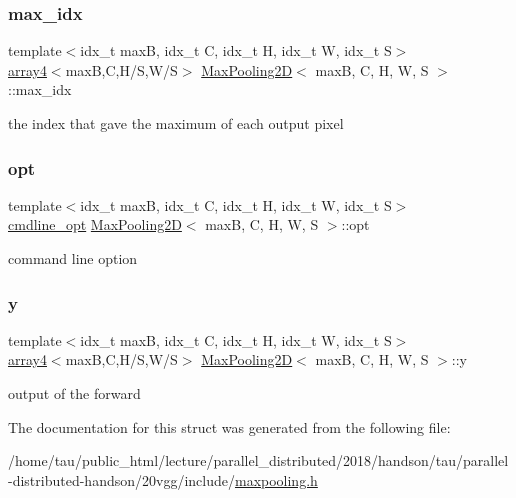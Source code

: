 \subsubsection{\texorpdfstring{max\+\_\+idx}{max\_idx}}
{\footnotesize\ttfamily template$<$idx\+\_\+t maxB, idx\+\_\+t C, idx\+\_\+t H, idx\+\_\+t W, idx\+\_\+t S$>$ \\
\hyperlink{structarray4}{array4}$<$maxB,C,H/S,W/S$>$ \hyperlink{structMaxPooling2D}{Max\+Pooling2D}$<$ maxB, C, H, W, S $>$\+::max\+\_\+idx}

the index that gave the maximum of each output pixel \mbox{\label{structMaxPooling2D_a573bf3df3ae3d9043763c6743f1b87f9}} 
\subsubsection{\texorpdfstring{opt}{opt}}
{\footnotesize\ttfamily template$<$idx\+\_\+t maxB, idx\+\_\+t C, idx\+\_\+t H, idx\+\_\+t W, idx\+\_\+t S$>$ \\
\hyperlink{structcmdline__opt}{cmdline\+\_\+opt} \hyperlink{structMaxPooling2D}{Max\+Pooling2D}$<$ maxB, C, H, W, S $>$\+::opt}

command line option \mbox{\label{structMaxPooling2D_a0ad5375e31a495c53600f3367da9fddc}} 
\subsubsection{\texorpdfstring{y}{y}}
{\footnotesize\ttfamily template$<$idx\+\_\+t maxB, idx\+\_\+t C, idx\+\_\+t H, idx\+\_\+t W, idx\+\_\+t S$>$ \\
\hyperlink{structarray4}{array4}$<$maxB,C,H/S,W/S$>$ \hyperlink{structMaxPooling2D}{Max\+Pooling2D}$<$ maxB, C, H, W, S $>$\+::y}

output of the forward 

The documentation for this struct was generated from the following file\+:\begin{DoxyCompactItemize}
\item 
/home/tau/public\+\_\+html/lecture/parallel\+\_\+distributed/2018/handson/tau/parallel-\/distributed-\/handson/20vgg/include/\hyperlink{maxpooling_8h}{maxpooling.\+h}\end{DoxyCompactItemize}
